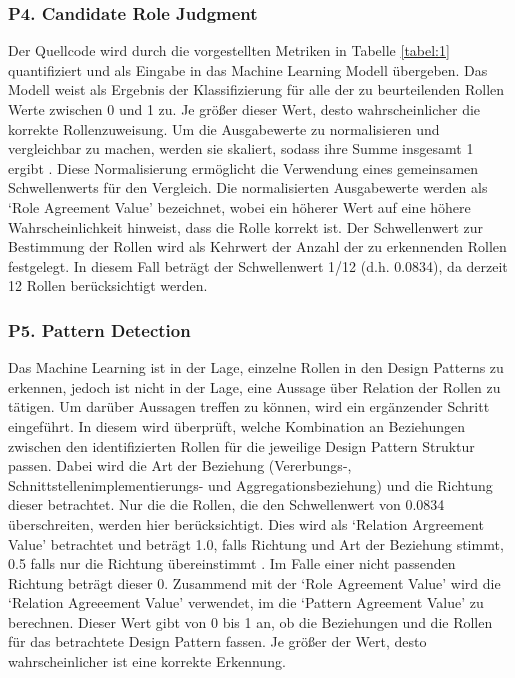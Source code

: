 \documentclass[conference]{IEEEtran}
\begin{document}
\subsubsection*{P4. Candidate Role Judgment}

Der Quellcode wird durch die vorgestellten Metriken in Tabelle \ref*{tabel:1} quantifiziert und als Eingabe in das Machine Learning Modell übergeben. Das Modell weist als Ergebnis der Klassifizierung für alle der zu beurteilenden Rollen Werte zwischen 0 und 1 zu. Je größer dieser Wert, desto wahrscheinlicher die korrekte Rollenzuweisung.
Um die Ausgabewerte zu normalisieren und vergleichbar zu machen, werden sie skaliert, sodass ihre Summe insgesamt 1 ergibt \cite[p. 5]{dodmetrics}. Diese Normalisierung ermöglicht die Verwendung eines gemeinsamen Schwellenwerts für den Vergleich. Die normalisierten Ausgabewerte werden als `Role Agreement Value' bezeichnet, wobei ein höherer Wert auf eine höhere Wahrscheinlichkeit hinweist, dass die Rolle korrekt ist.
Der Schwellenwert zur Bestimmung der Rollen wird als Kehrwert der Anzahl der zu erkennenden Rollen festgelegt. In diesem Fall beträgt der Schwellenwert 1/12 (d.h. 0.0834), da derzeit 12 Rollen berücksichtigt werden.

\subsubsection*{P5. Pattern Detection}

Das Machine Learning ist in der Lage, einzelne Rollen in den Design Patterns zu erkennen, jedoch ist nicht in der Lage, eine Aussage über Relation der Rollen zu tätigen. Um darüber Aussagen treffen zu können, wird ein ergänzender Schritt eingeführt. 
In diesem wird überprüft, welche Kombination an Beziehungen zwischen den identifizierten Rollen für die jeweilige Design Pattern Struktur passen. Dabei wird die Art der Beziehung (Vererbungs-, Schnittstellenimplementierungs- und Aggregationsbeziehung) und die Richtung dieser betrachtet. Nur die die Rollen, die den Schwellenwert von 0.0834 überschreiten, werden hier berücksichtigt.
Dies wird als `Relation Argreement Value' betrachtet und beträgt 1.0, falls Richtung und Art der Beziehung stimmt, 0.5 falls nur die Richtung übereinstimmt \cite[p. 6]{dodmetrics}. Im Falle einer nicht passenden Richtung beträgt dieser 0. Zusammend mit der `Role Agreement Value' wird die `Relation Agreeement Value' verwendet, im die `Pattern Agreement Value' zu berechnen. Dieser Wert gibt von 0 bis 1 an, ob die Beziehungen und die Rollen für das betrachtete Design Pattern fassen.
Je größer der Wert, desto wahrscheinlicher ist eine korrekte Erkennung. 
\end{document}

